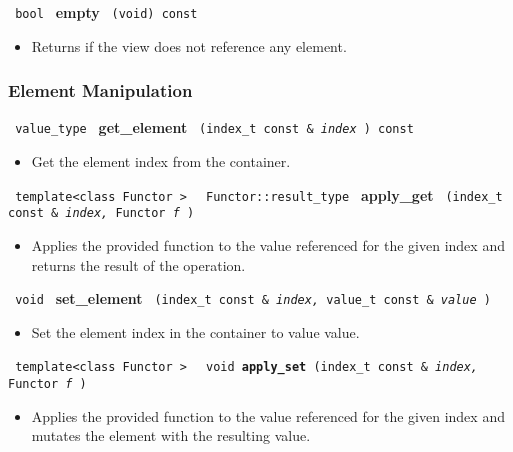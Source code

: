 \noindent
\texttt{%
bool
}
\newline
\textbf{empty}%
\texttt{%
(void) const
}

\begin{itemize}
\item
Returns if the view does not reference any element.
\end{itemize}

\subsubsection{Element Manipulation}

\noindent
\texttt{%
value\_type
}
\newline
\textbf{get\_element}%
\texttt{%
(index\_t const \&
\textit{index}%
) const
}

\begin{itemize}
\item
Get the element index from the container.
\end{itemize}

\noindent
\texttt{%
template<class Functor >
}
\texttt{%
Functor::result\_type
}
\newline
\textbf{apply\_get}%
\texttt{%
(index\_t const \&
\textit{index,}%
Functor
\textit{f}%
)
}

\begin{itemize}
\item
Applies the provided function to the value referenced for the given index and returns the result of the operation.
\end{itemize}

\noindent
\texttt{%
void
}
\newline
\textbf{set\_element}%
\texttt{%
(index\_t const \&
\textit{index,}%
value\_t const \&
\textit{value}%
)
}

\begin{itemize}
\item
Set the element index in the container to value value.
\end{itemize}

\noindent
\texttt{%
template<class Functor >
}
\texttt{%
void
\newline
\textbf{apply\_set}%
(index\_t const \&
\textit{index,}%
Functor
\textit{f}%
)
}

\begin{itemize}
\item
Applies the provided function to the value referenced for the given index and mutates the element with the resulting value.
\end{itemize}

